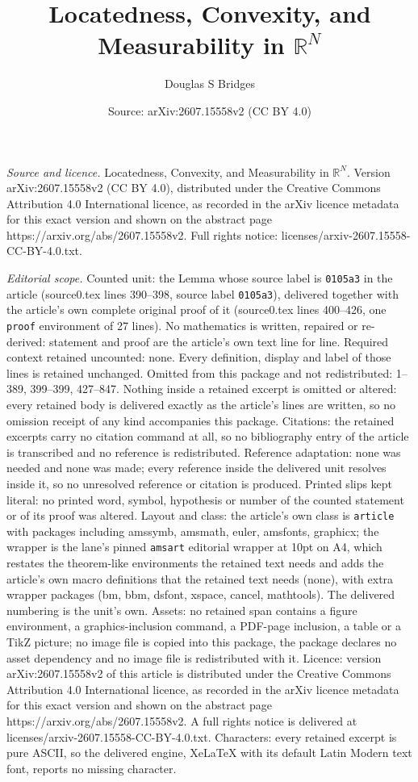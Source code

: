 \documentclass[10pt,a4paper]{amsart}
\title[Locatedness, Convexity, and Measurability in $\mathbb{R}^N$]{Locatedness, Convexity, and Measurability in $\mathbb{R}^N$}
\author{Douglas S Bridges}
\date{Source: arXiv:2607.15558v2 (CC BY 4.0)}
\begin{document}
\maketitle

\noindent\emph{Source and licence.} Locatedness, Convexity, and Measurability in $\mathbb{R}^N$. Version arXiv:2607.15558v2 (CC BY 4.0), distributed under the Creative Commons Attribution 4.0 International licence, as recorded in the arXiv licence metadata for this exact version and shown on the abstract page https://arxiv.org/abs/2607.15558v2. Full rights notice: licenses/arxiv-2607.15558-CC-BY-4.0.txt.\par\smallskip

\noindent\textit{Editorial scope.} Counted unit: the Lemma whose source label is \texttt{0105a3} in the article (source0.tex lines 390--398, source label \texttt{0105a3}), delivered together with the article's own complete original proof of it (source0.tex lines 400--426, one \texttt{proof} environment of 27 lines). No mathematics is written, repaired or re-derived: statement and proof are the article's own text line for line. Required context retained uncounted: none. Every definition, display and label of those lines is retained unchanged. Omitted from this package and not redistributed: 1--389, 399--399, 427--847. Nothing inside a retained excerpt is omitted or altered: every retained body is delivered exactly as the article's lines are written, so no omission receipt of any kind accompanies this package. Citations: the retained excerpts carry no citation command at all, so no bibliography entry of the article is transcribed and no reference is redistributed. Reference adaptation: none was needed and none was made; every reference inside the delivered unit resolves inside it, so no unresolved reference or citation is produced. Printed slips kept literal: no printed word, symbol, hypothesis or number of the counted statement or of its proof was altered. Layout and class: the article's own class is \texttt{article} with packages including amssymb, amsmath, euler, amsfonts, graphicx; the wrapper is the lane's pinned \texttt{amsart} editorial wrapper at 10pt on A4, which restates the theorem-like environments the retained text needs and adds the article's own macro definitions that the retained text needs (none), with extra wrapper packages (bm, bbm, dsfont, xspace, cancel, mathtools). The delivered numbering is the unit's own. Assets: no retained span contains a figure environment, a graphics-inclusion command, a PDF-page inclusion, a table or a TikZ picture; no image file is copied into this package, the package declares no asset dependency and no image file is redistributed with it. Licence: version arXiv:2607.15558v2 of this article is distributed under the Creative Commons Attribution 4.0 International licence, as recorded in the arXiv licence metadata for this exact version and shown on the abstract page https://arxiv.org/abs/2607.15558v2. A full rights notice is delivered at licenses/arxiv-2607.15558-CC-BY-4.0.txt. Characters: every retained excerpt is pure ASCII, so the delivered engine, XeLaTeX with its default Latin Modern text font, reports no missing character.
\end{document}
